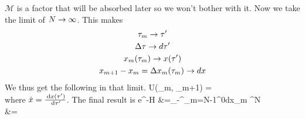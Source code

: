 \documentclass{article}
\begin{document}
\eeq
\(\mathcal{M}\) is a factor that will be absorbed later so we won't bother with it. Now we take the limit of \(N \rightarrow \infty\). This makes
\begin{gather}
\tau_m \rightarrow \tau^\prime\\
\Delta \tau \rightarrow d\tau^\prime\\
x_m(\tau_m) \rightarrow x(\tau^\prime)\\
x_{m+1} - x_m = \Delta x_m(\tau_m) \rightarrow dx
\end{gather}
We thus get the following in that limit.
\beq
{} U(\tau_m, \tau_{m+1}) = \\
\eeq
where \(\dot x = \frac{\:\mathrm{d}x(\tau^\prime)}{\:\mathrm{d}\tau^\prime}\). The final result is
\beq
\bra{2\pi} e^{-\fr{\tau}{\hbar}H}  &=\int_{-\infty}^\infty \prod_{m=N-1}^{0}dx_m ^N \\
					  &=\int{}
\eeq
\end{document}
